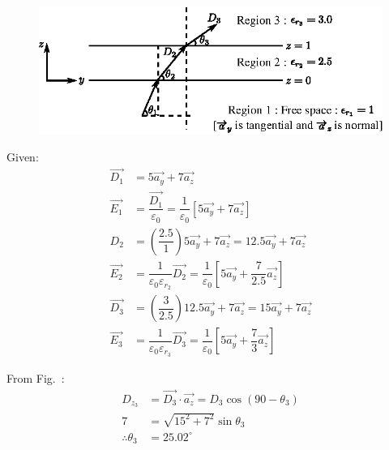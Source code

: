 \begin{solution}
~

\begin{figure}[H]
\centering
\includegraphics[scale=1.1]{images/fig6.eps}\label{chap27-fig6}
\end{figure}

Given:
\begin{align*}
\overrightarrow{D_{1}} & = 5\overrightarrow{a_{y}} + 7\overrightarrow{a_{z}}\\
\overrightarrow{E_{1}} & = \dfrac{\overrightarrow{D_{1}}}{\varepsilon_{0}} = \dfrac{1}{\varepsilon_{0}} [5\overrightarrow{a_{y}} + 7\overrightarrow{a_{z}}]\\
D_{2} & = \left(\dfrac{2.5}{1}\right) 5\overrightarrow{a_{y}} + 7\overrightarrow{a_{z}} = 12.5\overrightarrow{a_{y}} + 7\overrightarrow{a_{z}}\\
\overrightarrow{E_{2}} & = \dfrac{1}{\varepsilon_{0}\varepsilon_{r_{2}}} \overrightarrow{D_{2}} = \dfrac{1}{\varepsilon_{0}} \left[5\overrightarrow{a_{y}} + \dfrac{7}{2.5} \overrightarrow{a_{z}}\right]\\
\overrightarrow{D_{3}} & = \left(\dfrac{3}{2.5}\right) 12.5\overrightarrow{a_{y}} + 7\overrightarrow{a_{z}} = 15\overrightarrow{a_{y}} + 7\overrightarrow{a_{z}}\\
\overrightarrow{E_{3}} & = \dfrac{1}{\varepsilon_{0}\varepsilon_{r_{3}}} \overrightarrow{D_{3}} = \dfrac{1}{\varepsilon_{0}} \left[5\overrightarrow{a_{y}} + \dfrac{7}{3} \overrightarrow{a_{z}}\right]
\end{align*}

From Fig.~: 
\begin{align*}
D_{z_{3}} & = \overrightarrow{D_{3}} \cdot \overrightarrow{a_{z}} = D_{3} \cos (90 - \theta_{3})\\
7 & = \sqrt{15^{2} + 7^{2}} \sin \theta_{3}\\
\therefore \theta_{3} & = 25.02^{\circ}
\end{align*}
\end{solution}

